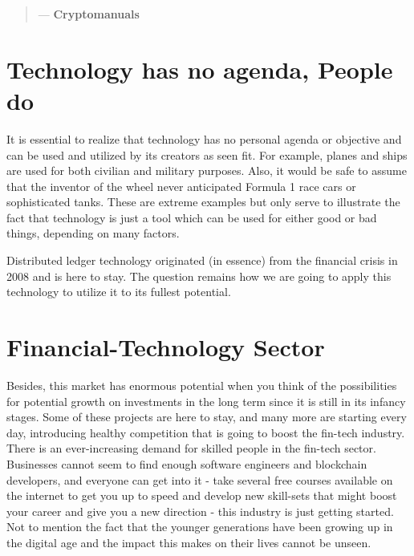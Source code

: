 \begin{quotation}

      \textit{}
      \begin{flushright}
        \small{--- \textbf{Cryptomanuals}}
      \end{flushright}
    
\end{quotation}

\section{Technology has no agenda, People do}
It is essential to realize that technology has no personal agenda or objective and can be used and utilized by its creators as seen fit. For example, planes and ships are used for both civilian and military purposes. Also, it would be safe to assume that the inventor of the wheel never anticipated Formula 1 race cars or sophisticated tanks. These are extreme examples but only serve to illustrate the fact that technology is just a tool which can be used for either good or bad things, depending on many factors.\medskip 

Distributed ledger technology originated (in essence) from the financial crisis in 2008 and is here to stay. The question remains how we are going to apply this technology to utilize it to its fullest potential. 


\section{Financial-Technology Sector}
Besides, this market has enormous potential when you think of the possibilities for potential growth on investments in the long term since it is still in its infancy stages. Some of these projects are here to stay, and many more are starting every day, introducing healthy competition that is going to boost the fin-tech industry. There is an ever-increasing demand for skilled people in the fin-tech sector. Businesses cannot seem to find enough software engineers and blockchain developers, and everyone can get into it - take several free courses available on the internet to get you up to speed and develop new skill-sets that might boost your career and give you a new direction - this industry is just getting started. Not to mention the fact that the younger generations have been growing up in the digital age and the impact this makes on their lives cannot be unseen.\medskip

